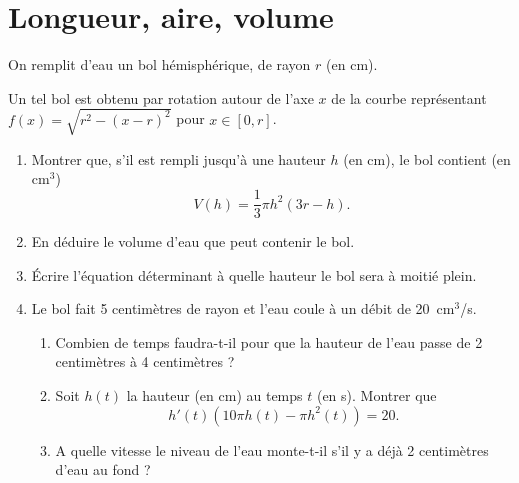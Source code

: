 \documentclass[11pt,class=report,crop=false]{standalone}
\begin{document}

\section*{Longueur, aire, volume}


\exercice{}
\enonce
    On remplit d'eau un bol hémisphérique, de rayon $r$ (en {cm}).
    \begin{center}
       
    \end{center}
    Un tel bol est obtenu par rotation autour de l'axe $x$ de la courbe représentant $f(x)=\sqrt{r^{2}-(x-r)^{2}}$ pour $x \in [0,r]$.
    \begin{enumerate}
        \item Montrer que, s'il est rempli jusqu'à une hauteur $h$ (en {cm}), le bol contient (en {cm$^{3}$})
        $$
            V(h)= \frac{1}{3}\pi h^{2}(3r-h).
        $$
        \item En déduire le volume d'eau que peut contenir le bol.
        \item Écrire l'équation déterminant à quelle hauteur le bol sera à moitié plein.
        \item Le bol fait 5 centimètres de rayon et l'eau coule à un débit de {20}~{cm$^3$/s}.

        \noindent
        \begin{minipage}{9.5cm}
            \begin{enumerate}
                \item Combien de temps faudra-t-il pour que la hauteur de l'eau passe de 2 centimètres à 4 centimètres ?
                \item Soit $h(t)$ la hauteur (en {cm}) au temps $t$ (en {s}). Montrer que
                $$
                    h'(t)(10\pi h(t)-\pi h^{2}(t)) = 20.
                $$
                \item A quelle vitesse le niveau de l'eau monte-t-il s'il y a déjà 2 centimètres d'eau au fond ?
            \end{enumerate}
        \end{minipage}
        \begin{minipage}{7cm}
            \vspace{2mm}\hfill
            
        \end{minipage}
    \end{enumerate}
\finenonce
\end{document}
